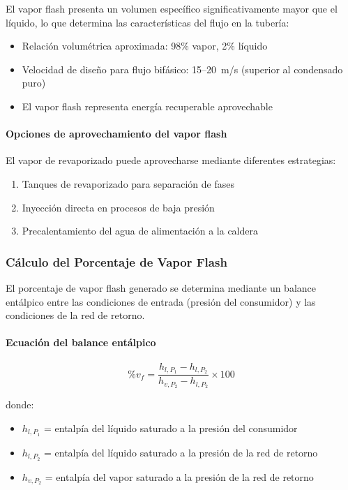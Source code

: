 El vapor flash presenta un volumen específico significativamente mayor que el líquido, lo que determina las características del flujo en la tubería:

\begin{itemize}[noitemsep]
	\item Relación volumétrica aproximada: 98\% vapor, 2\% líquido
	\item Velocidad de diseño para flujo bifásico: 15--20~m/s (superior al condensado puro)
	\item El vapor flash representa energía recuperable aprovechable
\end{itemize}

\paragraph{Opciones de aprovechamiento del vapor flash}

El vapor de revaporizado puede aprovecharse mediante diferentes estrategias:

\begin{enumerate}[noitemsep]
	\item Tanques de revaporizado para separación de fases
	\item Inyección directa en procesos de baja presión
	\item Precalentamiento del agua de alimentación a la caldera
\end{enumerate}

\subsubsection{Cálculo del Porcentaje de Vapor Flash}
\label{subsubsec:calculo-vapor-flash}

El porcentaje de vapor flash generado se determina mediante un balance entálpico entre las condiciones de entrada (presión del consumidor) y las condiciones de la red de retorno.

\paragraph{Ecuación del balance entálpico}

\begin{equation}
	\%v_f = \frac{h_{l,P_1} - h_{l,P_2}}{h_{v,P_2} - h_{l,P_2}} \times 100
	\label{eq:vapor-flash}
\end{equation}

donde:
\begin{itemize}[noitemsep]
	\item $h_{l,P_1}$ = entalpía del líquido saturado a la presión del consumidor
	\item $h_{l,P_2}$ = entalpía del líquido saturado a la presión de la red de retorno
	\item $h_{v,P_2}$ = entalpía del vapor saturado a la presión de la red de retorno
\end{itemize}

